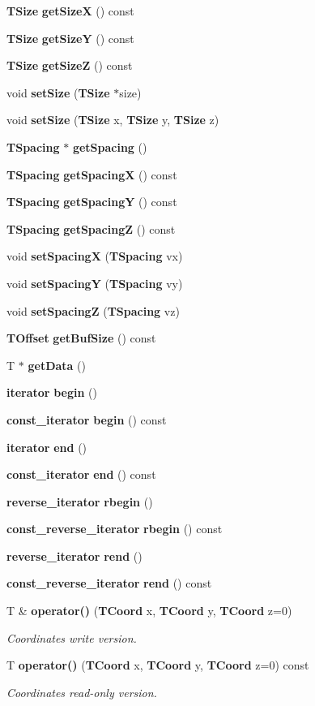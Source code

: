 \begin{CompactItemize}
\item 
{\bf TSize} {\bf get\-Size\-X} () const 
\item 
{\bf TSize} {\bf get\-Size\-Y} () const 
\item 
{\bf TSize} {\bf get\-Size\-Z} () const 
\item 
void {\bf set\-Size} ({\bf TSize} $\ast$size)
\item 
void {\bf set\-Size} ({\bf TSize} x, {\bf TSize} y, {\bf TSize} z)
\item 
{\bf TSpacing} $\ast$ {\bf get\-Spacing} ()
\item 
{\bf TSpacing} {\bf get\-Spacing\-X} () const 
\item 
{\bf TSpacing} {\bf get\-Spacing\-Y} () const 
\item 
{\bf TSpacing} {\bf get\-Spacing\-Z} () const 
\item 
void {\bf set\-Spacing\-X} ({\bf TSpacing} vx)
\item 
void {\bf set\-Spacing\-Y} ({\bf TSpacing} vy)
\item 
void {\bf set\-Spacing\-Z} ({\bf TSpacing} vz)
\item 
{\bf TOffset} {\bf get\-Buf\-Size} () const 
\item 
T $\ast$ {\bf get\-Data} ()
\item 
{\bf iterator} {\bf begin} ()
\item 
{\bf const\_\-iterator} {\bf begin} () const 
\item 
{\bf iterator} {\bf end} ()
\item 
{\bf const\_\-iterator} {\bf end} () const 
\item 
{\bf reverse\_\-iterator} {\bf rbegin} ()
\item 
{\bf const\_\-reverse\_\-iterator} {\bf rbegin} () const 
\item 
{\bf reverse\_\-iterator} {\bf rend} ()
\item 
{\bf const\_\-reverse\_\-iterator} {\bf rend} () const 
\item 
T \& {\bf operator()} ({\bf TCoord} x, {\bf TCoord} y, {\bf TCoord} z=0)
\begin{CompactList}\small\item\em Coordinates write version. \item\end{CompactList}\item 
T {\bf operator()} ({\bf TCoord} x, {\bf TCoord} y, {\bf TCoord} z=0) const 
\begin{CompactList}\small\item\em Coordinates read-only version. \item\end{CompactList}\item 

\end{CompactItemize}
